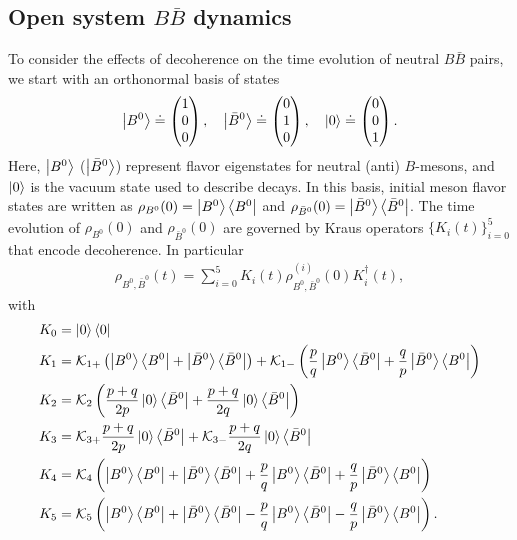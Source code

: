 \subsection{Open system $B\bar{B}$ dynamics}
To consider the effects of decoherence on the time evolution of neutral $B\bar{B}$ pairs, we start with an orthonormal basis of states
\begin{align}
\ket{B^0}\doteq\begin{pmatrix} 1\\0\\0 \end{pmatrix},\quad \ket{\bar{B}^0}\doteq\begin{pmatrix} 0\\1\\0 \end{pmatrix},\quad \ket{0}\doteq\begin{pmatrix} 0\\0\\1 \end{pmatrix}.
\end{align}
Here, $\ket{B^0}$ ($\ket{\bar{B}^0}$) represent flavor eigenstates for neutral (anti) $B$-mesons, and $\ket{0}$ is the vacuum state used to describe decays. In this basis, initial meson flavor states are written as $\rho_{B^0}(0)=\ket{B^0}\bra{B^0}$ and $\rho_{\bar{B}^0}(0)=\ket{\bar{B}^0}\bra{\bar{B}^0}$. The time evolution of $\rho_{B^0}(0)$ and $\rho_{\bar{B}^0}(0)$ are governed by Kraus operators $\{K_i(t)\}_{i=0}^{5}$ that encode decoherence. In particular
\begin{align}
\label{eq:timeevolution}
\rho_{B^0,\bar{B}^0}(t) = \sum_{i=0}^5K_i(t)\rho^{(i)}_{B^0,\bar{B}^0}(0)K_i^\dagger(t),
\end{align}
with
\begin{align}
\label{eq:firstkraus}
K_0 &= \ket{0}\bra{0} \\
K_1 &= \mathcal{K}_{1+}\left(\ket{B^0}\bra{B^0} + \ket{\bar{B}^0}\bra{\bar{B}^0}\right) +\mathcal{K}_{1-}\left(\frac{p}{q}\ket{B^0}\bra{\bar{B}^0}+\frac{q}{p} \ket{\bar{B}^0}\bra{B^0}\right) \\
K_2 &= \mathcal{K}_2\left(\frac{p+q}{2p}\ket{0}\bra{\bar{B}^0}+\frac{p+q}{2q}\ket{0}\bra{\bar{B}^0}\right) \\
K_3 &= \mathcal{K}_{3+}\frac{p+q}{2p}\ket{0}\bra{\bar{B}^0}+\mathcal{K}_{3-}\frac{p+q}{2q}\ket{0}\bra{\bar{B}^0} \\
K_4 &= \mathcal{K}_{4}\left(\ket{B^0}\bra{B^0} + \ket{\bar{B}^0}\bra{\bar{B}^0} +\frac{p}{q}\ket{B^0}\bra{\bar{B}^0}+\frac{q}{p} \ket{\bar{B}^0}\bra{B^0}\right) \\
\label{eq:lastkraus}
K_5 &= \mathcal{K}_{5}\left(\ket{B^0}\bra{B^0} + \ket{\bar{B}^0}\bra{\bar{B}^0} -\frac{p}{q}\ket{B^0}\bra{\bar{B}^0}-\frac{q}{p} \ket{\bar{B}^0}\bra{B^0}\right).
\end{align}
